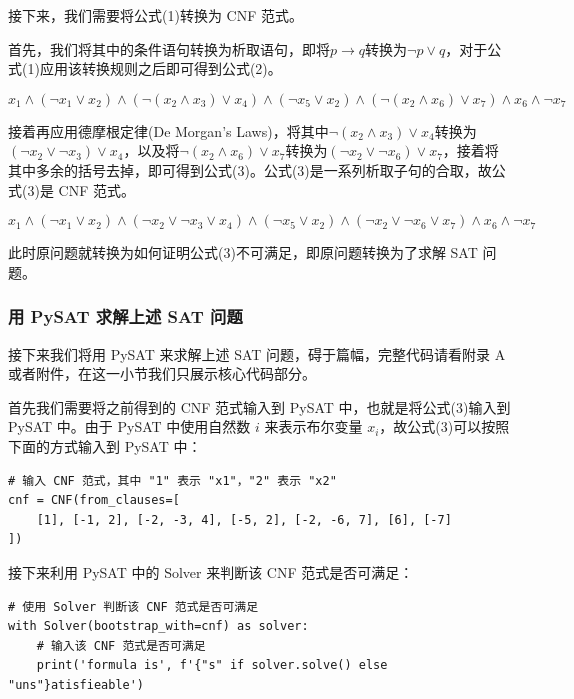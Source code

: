 \documentclass{article}
\begin{document}
接下来，我们需要将公式(1)转换为 CNF 范式。

首先，我们将其中的条件语句转换为析取语句，即将$p \to q$转换为$\neg p \vee q$，对于公式(1)应用该转换规则之后即可得到公式(2)。

\begin{equation}
    x_1 \wedge (\neg x_1 \vee x_2) \wedge (\neg(x_2 \wedge x_3) \vee x_4) \wedge (\neg x_5 \vee x_2) \wedge (\neg(x_2 \wedge x_6) \vee x_7) \wedge x_6 \wedge \neg x_7
\end{equation}

接着再应用德摩根定律(De Morgan's Laws)，将其中$\neg(x_2 \wedge x_3) \vee x_4$转换为$(\neg x_2 \vee \neg x_3) \vee x_4$，以及将$\neg(x_2 \wedge x_6) \vee x_7$转换为$(\neg x_2 \vee \neg x_6) \vee x_7$，接着将其中多余的括号去掉，即可得到公式(3)。公式(3)是一系列析取子句的合取，故公式(3)是 CNF 范式。

\begin{equation}
    x_1 \wedge (\neg x_1 \vee x_2) \wedge (\neg x_2 \vee \neg x_3 \vee x_4) \wedge (\neg x_5 \vee x_2) \wedge (\neg x_2 \vee \neg x_6 \vee x_7) \wedge x_6 \wedge \neg x_7
\end{equation}

此时原问题就转换为如何证明公式(3)不可满足，即原问题转换为了求解 SAT 问题。

\subsubsection{用 PySAT 求解上述 SAT 问题}

接下来我们将用 PySAT 来求解上述 SAT 问题，碍于篇幅，完整代码请看附录 A 或者附件，在这一小节我们只展示核心代码部分。

首先我们需要将之前得到的 CNF 范式输入到 PySAT 中，也就是将公式(3)输入到 PySAT 中。由于 PySAT 中使用自然数 $i$ 来表示布尔变量 $x_i$，故公式(3)可以按照下面的方式输入到 PySAT 中：

\begin{lstlisting}
# 输入 CNF 范式，其中 "1" 表示 "x1"，"2" 表示 "x2"
cnf = CNF(from_clauses=[
    [1], [-1, 2], [-2, -3, 4], [-5, 2], [-2, -6, 7], [6], [-7]
])
\end{lstlisting}

接下来利用 PySAT 中的 Solver 来判断该 CNF 范式是否可满足：

\begin{lstlisting}
# 使用 Solver 判断该 CNF 范式是否可满足
with Solver(bootstrap_with=cnf) as solver:
    # 输入该 CNF 范式是否可满足
    print('formula is', f'{"s" if solver.solve() else "uns"}atisfieable')
\end{lstlisting}
\end{document}
